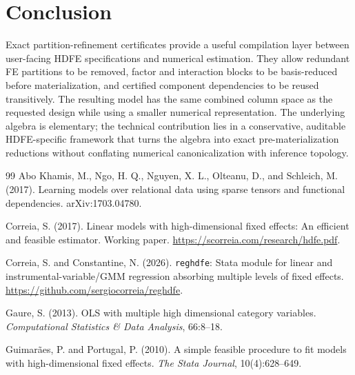\documentclass[11pt]{article}
\theoremstyle{definition}
\newcommand{\1}{\mathbf{1}}
\begin{document}
\section{Conclusion}

Exact partition-refinement certificates provide a useful compilation layer between user-facing HDFE specifications and numerical estimation. They allow redundant FE partitions to be removed, factor and interaction blocks to be basis-reduced before materialization, and certified component dependencies to be reused transitively. The resulting model has the same combined column space as the requested design while using a smaller numerical representation. The underlying algebra is elementary; the technical contribution lies in a conservative, auditable HDFE-specific framework that turns the algebra into exact pre-materialization reductions without conflating numerical canonicalization with inference topology.

\appendix


\begin{thebibliography}{99}
Abo Khamis, M., Ngo, H. Q., Nguyen, X. L., Olteanu, D., and Schleich, M. (2017). Learning models over relational data using sparse tensors and functional dependencies. arXiv:1703.04780.

Correia, S. (2017). Linear models with high-dimensional fixed effects: An efficient and feasible estimator. Working paper. \url{https://scorreia.com/research/hdfe.pdf}.

Correia, S. and Constantine, N. (2026). \texttt{reghdfe}: Stata module for linear and instrumental-variable/GMM regression absorbing multiple levels of fixed effects. \url{https://github.com/sergiocorreia/reghdfe}.

Gaure, S. (2013). OLS with multiple high dimensional category variables. \emph{Computational Statistics \& Data Analysis}, 66:8--18.

Guimar\~aes, P. and Portugal, P. (2010). A simple feasible procedure to fit models with high-dimensional fixed effects. \emph{The Stata Journal}, 10(4):628--649.
\end{thebibliography}
\end{document}
